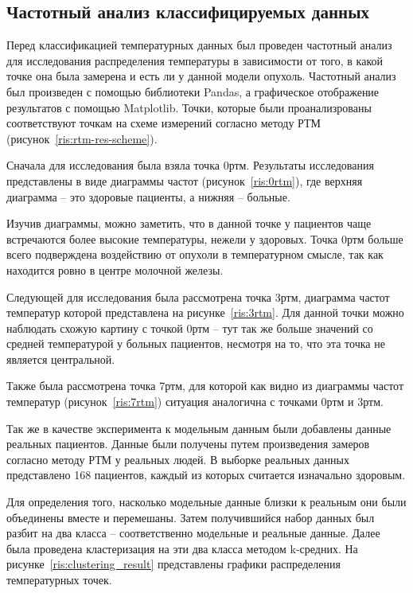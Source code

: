 \subsection{Частотный анализ классифицируемых данных}
Перед классификацией температурных данных был проведен частотный анализ для исследования распределения температуры в зависимости от того, в какой точке она была замерена и есть ли у данной модели опухоль. Частотный анализ был произведен с помощью библиотеки Pandas, а графическое отображение результатов с помощью Matplotlib. Точки, которые были проанализрованы соответствуют точкам на схеме измерений согласно методу РТМ (рисунок~\ref{ris:rtm-res-scheme}).
\par
Сначала для исследования была взяла точка 0ртм. Результаты исследования представлены в виде диаграммы частот (рисунок~\ref{ris:0rtm}), где верхняя диаграмма -- это здоровые пациенты, а нижняя -- больные.
\par
Изучив диаграммы, можно заметить, что в данной точке у пациентов чаще встречаются более высокие температуры, нежели у здоровых. Точка 0ртм больше всего подверждена воздействию от опухоли в температурном смысле, так как находится ровно в центре молочной железы.
\par
Следующей для исследования была рассмотрена точка 3ртм, диаграмма частот температур которой представлена на рисунке~\ref{ris:3rtm}. Для данной точки можно наблюдать схожую картину с точкой 0ртм -- тут так же больше значений со средней температурой у больных пациентов, несмотря на то, что эта точка не является центральной.
\par
Также была рассмотрена точка 7ртм, для которой как видно из диаграммы частот температур (рисунок~\ref{ris:7rtm}) ситуация аналогична с точками 0ртм и 3ртм.
\par
Так же в качестве эксперимента к модельным данным были добавлены данные реальных пациентов. Данные были получены путем произведения замеров согласно методу РТМ у реальных людей. В выборке реальных данных представлено 168 пациентов, каждый из которых считается изначально здоровым.
\par
Для определения того, насколько модельные данные близки к реальным они были объединены вместе и перемешаны. Затем получившийся набор данных был разбит на два класса -- соответственно модельные и реальные данные. Далее была проведена кластеризация на эти два класса методом k-средних. На рисунке~\ref{ris:clustering_result} представлены графики распределения температурных точек.
